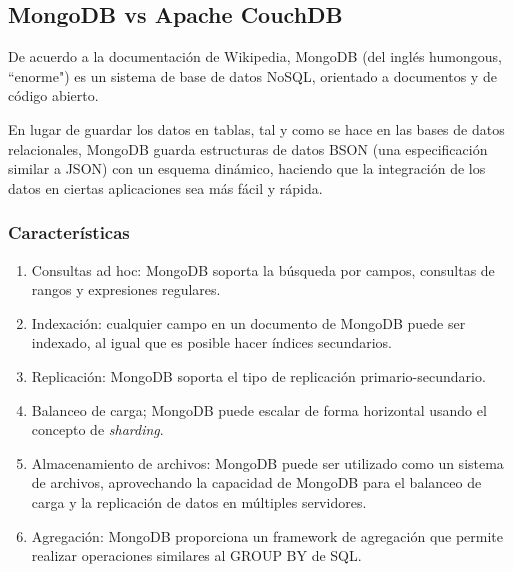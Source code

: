 \subsection{MongoDB vs Apache CouchDB}
De acuerdo a la documentación de Wikipedia\cite{noauthor_mongodb_nodate}, MongoDB (del inglés humongous, ``enorme") es un sistema de base de datos NoSQL, orientado a documentos y de código abierto.


En lugar de guardar los datos en tablas, tal y como se hace en las bases de datos relacionales, MongoDB guarda estructuras de datos BSON (una especificación similar a JSON) con un esquema dinámico, haciendo que la integración de los datos en ciertas aplicaciones sea más fácil y rápida.

\subsubsection*{Características}
\begin{enumerate}
    \item Consultas ad hoc: MongoDB soporta la búsqueda por campos, consultas de rangos y expresiones regulares.
    \item Indexación: cualquier campo en un documento de MongoDB puede ser indexado, al igual que es posible hacer índices secundarios. 
    \item Replicación: MongoDB soporta el tipo de replicación primario-secundario. 
    \item Balanceo de carga; MongoDB puede escalar de forma horizontal usando el concepto de \textit{sharding}.
    \item Almacenamiento de archivos: MongoDB puede ser utilizado como un sistema de archivos, aprovechando la capacidad de MongoDB para el balanceo de carga y la replicación de datos en múltiples servidores. 
    \item Agregación: MongoDB proporciona un framework de agregación que permite realizar operaciones similares al GROUP BY de SQL.
\end{enumerate}
